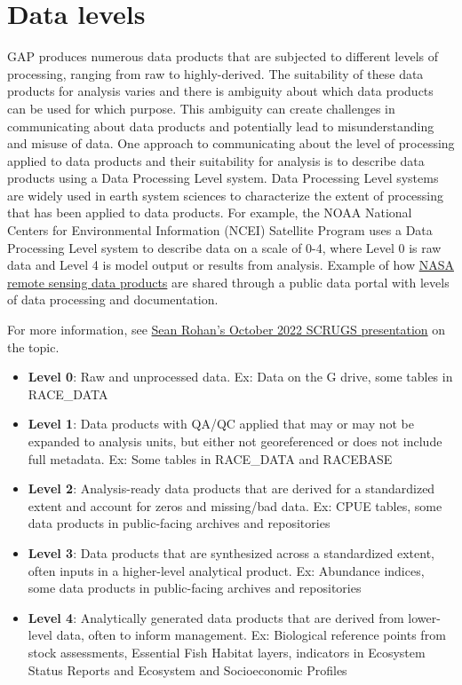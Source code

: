 \documentclass[
  letterpaper,
  oneside,
  open=any]{scrbook}
\providecommand{\tightlist}{%
  \setlength{\itemsep}{0pt}\setlength{\parskip}{0pt}}\usepackage{longtable,booktabs,array}
\begin{document}
\section{Data levels}\label{data-levels}

GAP produces numerous data products that are subjected to different
levels of processing, ranging from raw to highly-derived. The
suitability of these data products for analysis varies and there is
ambiguity about which data products can be used for which purpose. This
ambiguity can create challenges in communicating about data products and
potentially lead to misunderstanding and misuse of data. One approach to
communicating about the level of processing applied to data products and
their suitability for analysis is to describe data products using a Data
Processing Level system. Data Processing Level systems are widely used
in earth system sciences to characterize the extent of processing that
has been applied to data products. For example, the NOAA National
Centers for Environmental Information (NCEI) Satellite Program uses a
Data Processing Level system to describe data on a scale of 0-4, where
Level 0 is raw data and Level 4 is model output or results from
analysis. Example of how
\href{https://ladsweb.modaps.eosdis.nasa.gov/search/}{NASA remote
sensing data products} are shared through a public data portal with
levels of data processing and documentation.

For more information, see
\href{https://docs.google.com/presentation/d/1rWSZpeghWJqzWMIa5oBc4BCoy-zy1Yue86RoTw58u6M/edit?usp=sharing}{Sean
Rohan's October 2022 SCRUGS presentation} on the topic.

\begin{itemize}
\tightlist
\item
  \textbf{Level 0}: Raw and unprocessed data. Ex: Data on the G drive,
  some tables in RACE\_DATA
\item
  \textbf{Level 1}: Data products with QA/QC applied that may or may not
  be expanded to analysis units, but either not georeferenced or does
  not include full metadata. Ex: Some tables in RACE\_DATA and RACEBASE
\item
  \textbf{Level 2}: Analysis-ready data products that are derived for a
  standardized extent and account for zeros and missing/bad data. Ex:
  CPUE tables, some data products in public-facing archives and
  repositories
\item
  \textbf{Level 3}: Data products that are synthesized across a
  standardized extent, often inputs in a higher-level analytical
  product. Ex: Abundance indices, some data products in public-facing
  archives and repositories
\item
  \textbf{Level 4}: Analytically generated data products that are
  derived from lower-level data, often to inform management. Ex:
  Biological reference points from stock assessments, Essential Fish
  Habitat layers, indicators in Ecosystem Status Reports and Ecosystem
  and Socioeconomic Profiles
\end{itemize}
\end{document}
